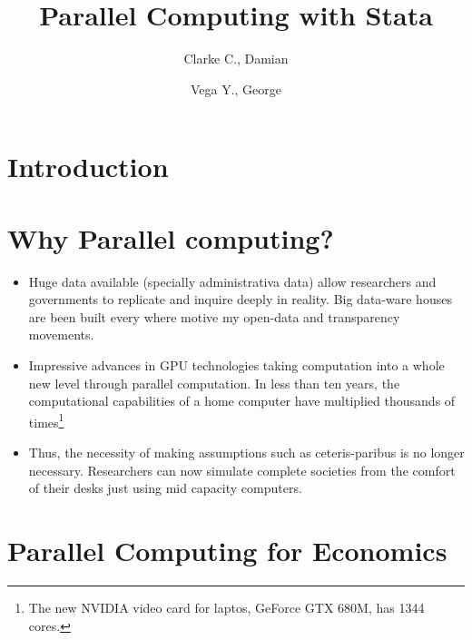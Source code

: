 \documentclass[letterpaper,12pt]{article}
\title{Parallel Computing with Stata}
\author{Clarke C., Damian \and Vega Y., George}
\begin{document}
\maketitle

\begin{abstract}

\end{abstract}

\section{Introduction}

\section{Why Parallel computing?}

\begin{itemize}
\item Huge data available (specially administrativa data) allow researchers and governments to replicate and inquire deeply in reality. Big data-ware houses are been built every where motive my open-data and transparency movements.
\item Impressive advances in GPU technologies taking computation into a whole new level through parallel computation. In less than ten years, the computational capabilities of a home computer have multiplied thousands of times\footnote{The new NVIDIA video card for laptos, GeForce GTX 680M, has 1344 cores.} 
\item Thus, the necessity of making assumptions such as ceteris-paribus is no longer necessary. Researchers can now simulate complete societies from the comfort of their desks just using mid capacity computers.
\end{itemize}

\section{Parallel Computing for Economics}

\nocite{vespignani2011modelling}



\end{document}
